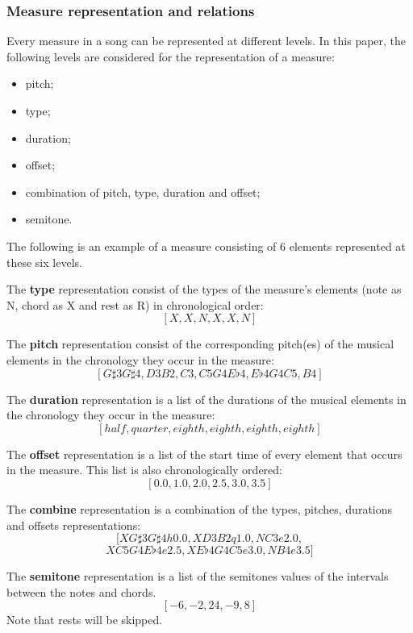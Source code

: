 \subsubsection{Measure representation and relations}
Every measure in a song can be represented at different levels. In this paper, the following levels are considered for the representation of a measure:
\begin{itemize}
	\item pitch;
	\item type;
	\item duration;
	\item offset;
	\item combination of pitch, type, duration and offset;
	\item semitone.
\end{itemize}
The following is an example of a measure consisting of 6 elements represented at these six levels.

The \textbf{type} representation consist of the types of the measure's elements (note as N, chord as X and rest as R) in chronological order:
\[ [X, X, N, X, X, N] \]


The \textbf{pitch} representation consist of the corresponding pitch(es) of the musical elements in the chronology they occur in the measure:
\[[G\sharp3G\sharp4, D3B2, C3, C5G4E\flat4, E\flat4G4C5, B4]\]

The \textbf{duration} representation is a list of the durations of the musical elements in the chronology they occur in the measure:
\[[half, quarter, eighth, eighth, eighth, eighth] \]

The \textbf{offset} representation is a list of the start time of every element that occurs in the measure. This list is also chronologically ordered:
\[[0.0, 1.0, 2.0, 2.5, 3.0, 3.5] \]

The \textbf{combine} representation is a combination of the types, pitches, durations and offsets representations:
\[ [XG\sharp3G\sharp4h0.0, XD3B2q1.0, NC3e2.0, \]
\[XC5G4E\flat4e2.5, XE\flat4G4C5e3.0, NB4e3.5] \]

The \textbf{semitone} representation is a list of the semitones values of the intervals between the notes and chords. 
\[[-6, -2, 24, -9, 8] \]
Note that rests will be skipped.